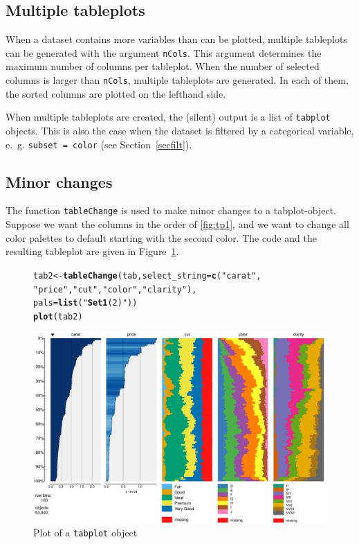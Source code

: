 \documentclass[11pt, fleqn, a4paper]{article}\usepackage{graphicx, color}
\makeatletter
\def\maxwidth{ %
  \ifdim\Gin@nat@width>\linewidth
    \linewidth
  \else
    \Gin@nat@width
  \fi
}
\newcommand{\hlfunctioncall}[1]{\textcolor[rgb]{0.501960784313725,0,0.329411764705882}{\textbf{#1}}}%
\newcommand{\hlstring}[1]{\textcolor[rgb]{0.6,0.6,1}{#1}}%
\newenvironment{kframe}{%
 \def\at@end@of@kframe{}%
 \ifinner\ifhmode%
  \def\at@end@of@kframe{\end{minipage}}%
  \begin{minipage}{\columnwidth}%
 \fi\fi%
 \def\FrameCommand##1{\hskip\@totalleftmargin \hskip-\fboxsep
 \colorbox{shadecolor}{##1}\hskip-\fboxsep
     \hskip-\linewidth \hskip-\@totalleftmargin \hskip\columnwidth}%
 \MakeFramed {\advance\hsize-\width
   \@totalleftmargin\z@ \linewidth\hsize
   \@setminipage}}%
 {\par\unskip\endMakeFramed%
 \at@end@of@kframe}
\newenvironment{knitrout}{}{} %
\makeatother
\begin{document}
\subsection{Multiple tableplots}

When a dataset contains more variables than can be plotted, multiple tableplots can be generated with the argument {\tt nCols}. This argument determines the maximum number of columns per tableplot. When the number of selected columns is larger than {\tt nCols}, multiple tableplots are generated. In each of them, the sorted columns are plotted on the lefthand side. 

When multiple tableplots are created, the (silent) output is a list of {\tt tabplot} objects. This is also the case when the dataset is filtered by a categorical variable, e.~g. {\tt subset = color}
(see Section~\ref{secfilt}).

\subsection{Minor changes}

The function {\tt tableChange} is used to make minor changes to a tabplot-object. Suppose we want the columns in the order of \ref{fig:tp1}, and we want to change all color palettes to default starting with the second color. The code and the resulting tableplot are given in Figure~\ref{fig:tp7}.

\begin{figure}[htp]
\begin{knitrout}
\color{fgcolor}\begin{kframe}
\begin{alltt}
tab2 <- \hlfunctioncall{tableChange}(tab, select_string = \hlfunctioncall{c}(\hlstring{"carat"}, 
    \hlstring{"price"}, \hlstring{"cut"}, \hlstring{"color"}, \hlstring{"clarity"}), 
    pals = \hlfunctioncall{list}(\hlstring{"\hlfunctioncall{Set1}(2)"}))
\hlfunctioncall{plot}(tab2)
\end{alltt}
\end{kframe}
\includegraphics[width=\maxwidth]{figure/chunk13} 

\end{knitrout}

\caption{Plot of a {\tt tabplot} object}
\label{fig:tp7}
\end{figure}
\end{document}
